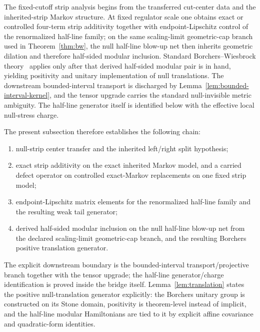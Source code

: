 \documentclass[11pt]{article}
\begin{document}
The fixed-cutoff strip analysis begins from the transferred cut-center data and the inherited-strip Markov structure. At fixed regulator scale one obtains exact or controlled four-term strip additivity together with endpoint-Lipschitz control of the renormalized half-line family; on the same scaling-limit geometric-cap branch used in Theorem~\ref{thm:bw}, the null half-line blow-up net then inherits geometric dilation and therefore half-sided modular inclusion. Standard Borchers--Wiesbrock theory~\cite{wiesbrock93} applies only after that derived half-sided modular pair is in hand, yielding positivity and unitary implementation of null translations. The downstream bounded-interval transport is discharged by Lemma~\ref{lem:bounded-interval-kernel}, and the tensor upgrade carries the standard null-invisible metric ambiguity. The half-line generator itself is identified below with the effective local null-stress charge.
\par
The present subsection therefore establishes the following chain:
\begin{enumerate}[leftmargin=2em]
\item null-strip center transfer and the inherited left/right split hypothesis;
\item exact strip additivity on the exact inherited Markov model, and a carried defect operator on controlled exact-Markov replacements on one fixed strip model;
\item endpoint-Lipschitz matrix elements for the renormalized half-line family and the resulting weak tail generator;
\item derived half-sided modular inclusion on the null half-line blow-up net from the declared scaling-limit geometric-cap branch, and the resulting Borchers positive translation generator.
\end{enumerate}
The explicit downstream boundary is the bounded-interval transport/projective branch together with the tensor upgrade; the half-line generator/charge identification is proved inside the bridge itself. Lemma~\ref{lem:translation} states the positive null-translation generator explicitly: the Borchers unitary group is constructed on its Stone domain, positivity is theorem-level instead of implicit, and the half-line modular Hamiltonians are tied to it by explicit affine covariance and quadratic-form identities.
\end{document}
